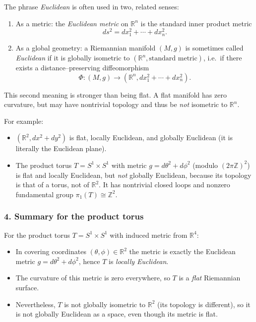 \documentclass[12pt,a4paper]{article}
\theoremstyle{plain}
\theoremstyle{definition}      %
\begin{document}
The phrase \emph{Euclidean} is often used in two, related senses:

\begin{enumerate}
	\item As a metric: the \emph{Euclidean metric} on $\mathbb{R}^{n}$ is
	the standard inner product metric
	\[
	ds^{2} = dx_{1}^{2} + \cdots + dx_{n}^{2}.
	\]
	\item As a global geometry: a Riemannian manifold $(M,g)$ is sometimes
	called \emph{Euclidean} if it is globally isometric to
	$(\mathbb{R}^{n},\text{standard metric})$, i.e.\ if there exists
	a distance--preserving diffeomorphism
	\[
	\Phi : (M,g) \longrightarrow (\mathbb{R}^{n},dx_{1}^{2}+\cdots+dx_{n}^{2}).
	\]
\end{enumerate}

This second meaning is stronger than being flat.  A flat manifold has
zero curvature, but may have nontrivial topology and thus be \emph{not}
isometric to $\mathbb{R}^{n}$.

For example:
\begin{itemize}
	\item $(\mathbb{R}^{2},dx^{2}+dy^{2})$ is flat, locally Euclidean, and
	globally Euclidean (it is literally the Euclidean plane).
	\item The product torus $T = S^{1}\times S^{1}$ with metric
	$g = d\theta^{2} + d\phi^{2}$ (modulo $(2\pi\mathbb{Z})^{2}$) is
	flat and locally Euclidean, but \emph{not} globally Euclidean,
	because its topology is that of a torus, not of $\mathbb{R}^{2}$.
	It has nontrivial closed loops and nonzero fundamental group
	$\pi_{1}(T)\cong\mathbb{Z}^{2}$.
\end{itemize}

\subsubsection*{4. Summary for the product torus}

For the product torus $T = S^{1}\times S^{1}$ with induced metric from
$\mathbb{R}^{4}$:

\begin{itemize}
	\item In covering coordinates $(\theta,\phi)\in\mathbb{R}^{2}$ the metric
	is exactly the Euclidean metric $g = d\theta^{2}+d\phi^{2}$,
	hence $T$ is \emph{locally Euclidean}.
	\item The curvature of this metric is zero everywhere, so $T$ is a
	\emph{flat} Riemannian surface.
	\item Nevertheless, $T$ is not globally isometric to $\mathbb{R}^{2}$
	(its topology is different), so it is not globally Euclidean as a
	space, even though its metric is flat.
\end{itemize}
\end{document}
